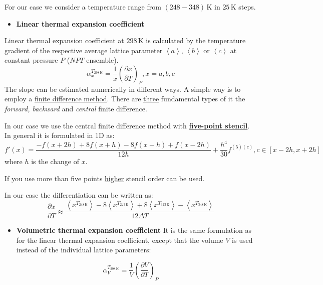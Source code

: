 \documentclass[
  letterpaper,
]{article}
\providecommand{\tightlist}{%
  \setlength{\itemsep}{0pt}\setlength{\parskip}{0pt}}\usepackage{longtable,booktabs,array}
\begin{document}
For our case we consider a temperature range from
\((248 - 348)\,\mathrm{K}\) in \(25\,\mathrm{K}\) steps.

\begin{itemize}
\tightlist
\item
  \textbf{Linear thermal expansion coefficient}
\end{itemize}

Linear thermal expansion coefficient at \(\mathrm{298}\,\mathrm{K}\) is
calculated by the temperature gradient of the respective average lattice
parameter \(\left < a \right >\), \(\left < b \right >\) or
\(\left < c\right >\) at constant pressure \(P\) (\(NPT\) ensemble). \[
\alpha _{x}^{T_{\mathrm{298\,K}}} = \frac{1}{x} \left ( \frac{\partial x}{\partial T} \right ) _{P}, x={a,b,c}
\] The slope can be estimated numerically in different ways. A simple
way is to employ a
\href{https://en.wikipedia.org/wiki/Finite_difference_method}{finite
difference method}. There are
\href{https://en.wikipedia.org/wiki/Finite_difference}{three}
fundamental types of it the \emph{forward, backward} and \emph{central}
finite difference.

In our case we use the central finite difference method with
\textbf{\href{https://en.wikipedia.org/wiki/Five-point_stencil}{five-point
stencil}}. In general it is formulated in 1D as: \[
f'(x) = \frac{-f(x+2h)+8f(x+h)-8f(x-h)+f(x-2h)}{12 h} + \frac{h^4}{30}f^{(5)(c)}, c \in [x-2h,x+2h]
\] where \(h\) is the change of \(x\).

If you use more than five points
\href{https://en.wikipedia.org/wiki/Finite_difference_coefficient}{higher}
stencil order can be used.

In our case the differentiation can be written as: \[
\frac{\partial x}{\partial T} \approx \frac{ \left < x^{T_{\mathrm{248\,K}}}\right >-8 \left < x^{T_{\mathrm{273\,K}}}\right > + 8 \left < x^{T_{\mathrm{323\,K}}}\right > - \left < x^{T_{\mathrm{348\,K}}} \right > }{12\Delta T}
\]

\begin{itemize}
\tightlist
\item
  \textbf{Volumetric thermal expansion coefficient} It is the same
  formulation as for the linear thermal expansion coefficient, except
  that the volume \(V\) is used instead of the individual lattice
  parameters:
\end{itemize}

\[
\alpha _{V}^{T_{\mathrm{298\,K}}} = \frac{1}{V} \left ( \frac{\partial V}{\partial T} \right ) _{P}
\]
\end{document}
